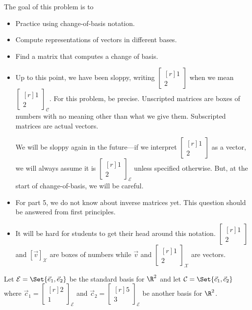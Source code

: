 \documentclass{problemset}
\newcommand{\xhat}{{\vec e_1}}
\newcommand{\yhat}{{\vec e_2}}
\newcommand{\mat}[1]{\begin{bmatrix*}[r]#1\end{bmatrix*}}
\newcommand{\displayonlynewpage}{\begin{displayonly}\newpage\end{displayonly}}
\begin{document}
	\question
	\begin{annotation}
		\begin{goals}

			The goal of this problem is to
		\displayonlynewpage
			\begin{itemize}
				\item Practice using change-of-basis notation.
				\item Compute representations of vectors in different bases.
				\item Find a matrix that computes a change of basis.
			\end{itemize}
		\end{goals}

		\begin{notes}
			\begin{itemize}
				\item Up to this point, we have been sloppy, writing $\mat{1\\2}$ when
					we mean $\mat{1\\2}_{\mathcal C}$. For this problem, be precise.
					Unscripted matrices are boxes of numbers with no meaning other
					than what we give them. Subscripted matrices are actual vectors.

					We will be sloppy again in the future---if we interpret $\mat{1\\2}$
					as a vector, we will always assume it is $\mat{1\\2}_{\mathcal E}$ unless
					specified otherwise. But, at the start of change-of-basis, we will be careful.
				\item For part 5, we do not know about inverse matrices yet. This question should
					be answered from first principles.
				\item It will be hard for students to get their head around this notation. $\mat{1\\2}$ and $[\vec v]_{\mathcal X}$
					are boxes of numbers while $\vec v$ and $\mat{1\\2}_{\mathcal X}$ are vectors.
			\end{itemize}
		\end{notes}
	\end{annotation}
	Let $\mathcal E=\Set{\xhat,\yhat}$ be the standard basis for $\R^2$ and
	let $\mathcal C=\Set{\vec c_1,\vec c_2}$ where $\vec c_1=\mat{2\\1}_{\mathcal E}$
	and $\vec c_2=\mat{5\\3}_{\mathcal E}$ be another basis for $\R^2$.
\end{document}
